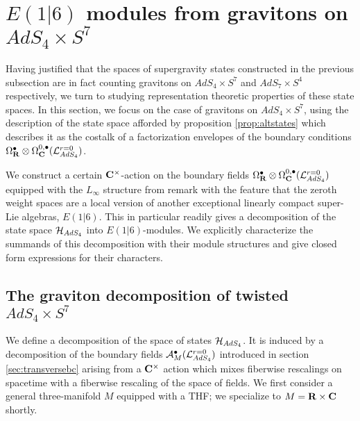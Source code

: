 \documentclass[../main.tex]{subfiles}
\begin{document}
 

\section{$E(1|6)$ modules from gravitons on $AdS_4\times S^7$}\label{sec:e16}

Having justified that the spaces of supergravity states constructed in the previous subsection are in fact counting gravitons on $AdS_4\times S^7$ and $AdS_7\times S^4$ respectively, we turn to studying representation theoretic properties of these state spaces. In this section, we focus on the case of gravitons on $AdS_4\times S^7$, using the description of the state space afforded by proposition \ref{prop:altstates} which describes it as the costalk of a factorization envelopes of the boundary conditions $\Omega^\bullet _{\mathbf{R}}\otimes \Omega^{0,\bullet}_{\mathbf{C}} (\mathcal{L}^{{r=0}}_{AdS_4} )$.

We construct a certain $\mathbf{C}^\times$-action on the boundary fields $\Omega^\bullet _{\mathbf{R}}\otimes \Omega^{0,\bullet}_{\mathbf{C}} (\mathcal{L}^{{r=0}}_{AdS_4} )$ equipped with the $L_\infty$ structure from remark \label{rmk:nottransferred} with the feature that the zeroth weight spaces are a local version of another exceptional linearly compact super-Lie algebras, $E(1|6)$. This in particular readily gives a decomposition of the state space $\mathcal{H}_{AdS_4}$ into $E(1|6)$-modules. We explicitly characterize the summands of this decomposition with their module structures and give closed form expressions for their characters.

\subsection{The graviton decomposition of twisted $AdS_4\times S^7$}
\parsec{}
We define a decomposition of the space of states $\mathcal{H}_{AdS_4}$.
It is induced by a decomposition of the boundary fields $\mathcal A^\bullet_{M} (\mathcal{L}^{{r=0}}_{AdS_4} )$ introduced in section \ref{sec:transversebc}  arising from a $\mathbf{C}^\times$ action which mixes fiberwise rescalings on spacetime with a fiberwise rescaling of the space of fields. 
We first consider a general three-manifold $M$ equipped with a THF; we specialize to $M = \mathbf{R} \times \mathbf{C}$ shortly.
\end{document}
